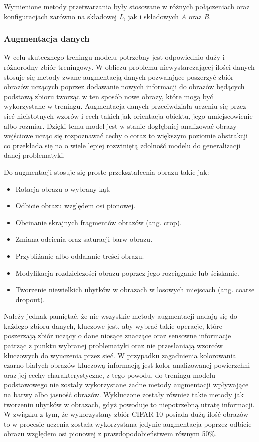   Wymienione metody przetwarzania były stosowane w różnych połączeniach oraz
  konfiguracjach zarówno na składowej \textit{L}, jak i składowych \textit{A}
  oraz \textit{B}.


  \subsubsection{Augmentacja danych}

  W celu skutecznego treningu modelu potrzebny jest odpowiednio duży i różnorodny
  zbiór treningowy. W obliczu problemu niewystarczającej ilości danych stosuje
  się metody zwane augmentacją danych pozwalające poszerzyć zbiór obrazów uczących
  poprzez dodawanie nowych informacji do obrazów będących podstawą zbioru tworząc
  w ten sposób nowe obrazy, które mogą być wykorzystane w treningu. Augmentacja
  danych przeciwdziała uczeniu się przez sieć nieistotnych wzorów i cech takich jak
  orientacja obiektu, jego umiejscowienie albo rozmiar. Dzięki temu model jest
  w stanie dogłębniej analizować obrazy wejściowe ucząc się rozpoznawać cechy
  o coraz to większym poziomie abstrakcji co przekłada się na o wiele lepiej
  rozwiniętą zdolność modelu do generalizacji danej problematyki.

  \noindent
  Do augmentacji stosuje się proste przekształcenia obrazu takie jak:
  \begin{itemize}
  \item Rotacja obrazu o wybrany kąt.
  \item Odbicie obrazu względem osi pionowej.
  \item Obcinanie skrajnych fragmentów obrazów (ang. crop).
  \item Zmiana odcienia oraz saturacji barw obrazu.
  \item Przybliżanie albo oddalanie treści obrazu.
  \item Modyfikacja rozdzielczości obrazu poprzez jego rozciąganie lub ściskanie.
  \item Tworzenie niewielkich ubytków w obrazach w losowych miejscach (ang. coarse dropout).
  \end{itemize}

  Należy jednak pamiętać, że nie wszystkie metody augmentacji nadają się do każdego zbioru
  danych, kluczowe jest, aby wybrać takie operacje, które poszerzają zbiór
  uczący o dane niosące znaczące oraz sensowne informacje patrząc z punktu wybranej
  problematyki oraz nie przesłaniają wzorców kluczowych do wyuczenia przez sieć.
  W przypadku zagadnienia kolorowania czarno-białych obrazów kluczową informacją
  jest kolor analizowanej powierzchni oraz jej cechy charakterystyczne, z tego
  powodu, do treningu modelu podstawowego nie zostały wykorzystane żadne metody
  augmentacji wpływające na barwy albo jasność obrazów. Wykluczone zostały również takie
  metody jak tworzeniu ubytków w obrazach, gdyż powoduje to niepotrzebną utratę
  informacji.
  W związku z tym, że wykorzystany zbiór CIFAR-10 posiada dużą ilość obrazów
  to w procesie uczenia została wykorzystana jedynie augmentacja poprzez
  odbicie obrazu względem osi pionowej z prawdopodobieństwem równym 50\%.

